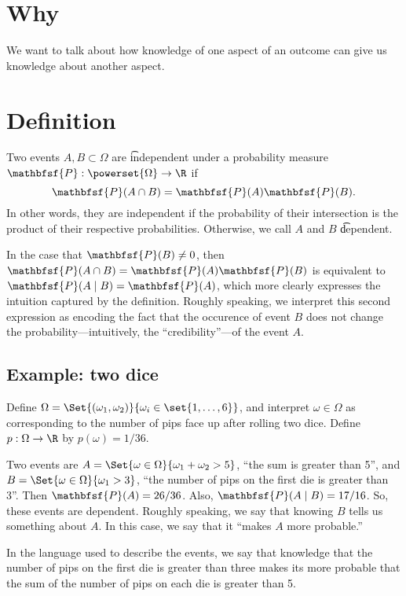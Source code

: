 

\section*{Why}

We want to talk about how knowledge of one aspect of an outcome can give us knowledge about another aspect.

\section*{Definition}

Two events $A, B \subset \Omega $ are \t{independent} under a probability measure $\mathbfsf{P} : \powerset{\Omega } \to \R $ if
\[
\mathbfsf{P} (A \cap  B) = \mathbfsf{P} (A)\mathbfsf{P} (B).
\]
In other words, they are independent if the probability of their intersection is the product of their respective probabilities.
Otherwise, we call $A$ and $B$ \t{dependent}.

In the case that $\mathbfsf{P} (B) \neq 0$, then $\mathbfsf{P} (A \cap  B) = \mathbfsf{P} (A)\mathbfsf{P} (B)$ is equivalent to $\mathbfsf{P} (A \mid B) = \mathbfsf{P} (A)$, which more clearly expresses the intuition captured by the definition.
Roughly speaking, we interpret this second expression as encoding the fact that the occurence of event $B$ does not change the probability---intuitively, the ``credibility''---of the event $A$.

\subsection*{Example: two dice}

Define $\Omega  = \Set{(\omega _1, \omega _2)}{ \omega _i \in \set{1, \dots , 6}}$, and interpret $\omega  \in \Omega $ as corresponding to the number of pips face up after rolling two dice.
Define $p: \Omega  \to \R $ by $p(\omega ) = 1/36$.

Two events are $A = \Set{\omega  \in \Omega }{ \omega _1 + \omega _2 > 5}$, ``the sum is greater than 5'', and $B = \Set{\omega  \in \Omega }{\omega _1 > 3}$, ``the number of pips on the first die is greater than 3''.
Then $\mathbfsf{P} (A) = 26/36$.
Also, $\mathbfsf{P} (A \mid  B) = 17/16$.
So, these events are dependent.
Roughly speaking, we say that knowing $B$ tells us something about $A$.
In this case, we say that it ``makes $A$ more probable.''

In the language used to describe the events, we say that knowledge that the number of pips on the first die is greater than three makes its more probable that the sum of the number of pips on each die is greater than 5.

